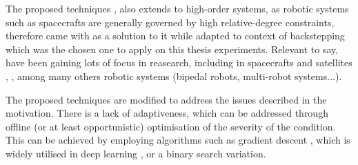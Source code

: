 The proposed techniques , also extends to high-order systems, as robotic systems such as spacecrafts are generally governed by high relative-degree constraints, therefore \cite{ames2019control} came with  as a solution to it while \cite{taylor2022safe} adapted to context of  backstepping~\cite{sepulchre2012constructive} which was the chosen one to apply on this thesis experiments.
Relevant to say,  have been gaining lots of focus in reasearch, including in spacecrafts and satellites \cite{breeden2022predictive, breeden2021guaranteed},  \cite{singletary2021comparative}, among many others robotic systems \cite{ames2019control} (bipedal robots, multi-robot systems...). 

The proposed techniques are modified to address the issues described in the motivation. There is a lack of adaptiveness, which can be addressed through offline (or at least opportunistic) optimisation of the severity of the  condition. This can be achieved by employing algorithms such as gradient descent \cite{ruder2016overview}, which is widely utilised in deep learning \cite{tian2023recent}, or a binary search \cite{lin2019binary} variation.

